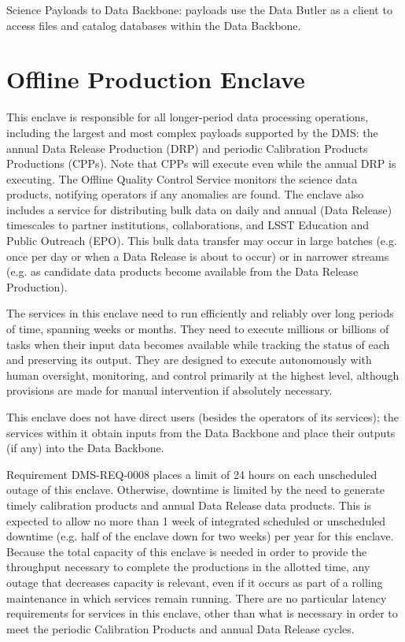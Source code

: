 \documentclass[DM,toc,lsstdraft]{lsstdoc}
\begin{document}
Science Payloads to Data Backbone: payloads use the Data Butler as a
client to access files and catalog databases within the Data Backbone.

\section{Offline Production Enclave}\label{offline-production-enclave}

This enclave is responsible for all longer-period data processing
operations, including the largest and most complex payloads supported by
the DMS: the annual Data Release Production (DRP) and periodic
Calibration Products Productions (CPPs). Note that CPPs will execute
even while the annual DRP is executing.
The Offline Quality Control Service monitors the science data
products, notifying operators if any anomalies are found.
The enclave also includes a service for distributing bulk data on daily and annual (Data Release) timescales to partner institutions, collaborations, and LSST Education and Public Outreach (EPO).
This bulk data transfer may occur in large batches (e.g. once per day or when a Data Release is about to occur) or in narrower streams (e.g. as candidate data products become available from the Data Release Production).

The services in this enclave need to run efficiently and reliably over
long periods of time, spanning weeks or months. They need to execute
millions or billions of tasks when their input data becomes available
while tracking the status of each and preserving its output. They are
designed to execute autonomously with human oversight, monitoring, and
control primarily at the highest level, although provisions are made for
manual intervention if absolutely necessary.

This enclave does not have direct users (besides the operators of its
services); the services within it obtain inputs from the Data Backbone
and place their outputs (if any) into the Data Backbone.

Requirement DMS-REQ-0008 places a limit of 24 hours on each unscheduled outage of this enclave.
Otherwise, downtime is limited by the need to generate timely calibration products and annual Data Release data products.
This is expected to allow no more than 1 week of integrated scheduled or unscheduled downtime (e.g. half of the enclave down for two weeks) per year for this enclave.
Because the total capacity of this enclave is needed in order to provide the throughput necessary to complete the productions in the allotted time, any outage that decreases capacity is relevant, even if it occurs as part of a rolling maintenance in which services remain running.
There are no particular latency requirements for services in this enclave, other than what is necessary in order to meet the periodic Calibration Products and annual Data Release cycles.
\end{document}
